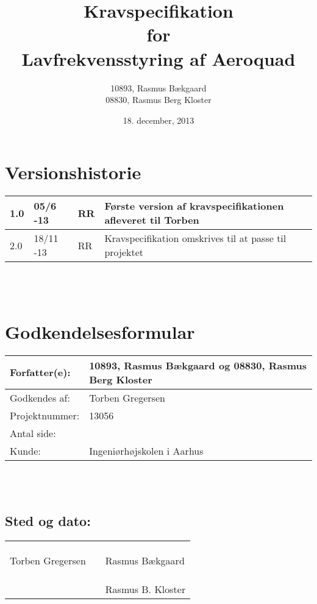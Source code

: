 \documentclass[oneside, 12pt]{memoir}
\title{Kravspecifikation \\ for \\ Lavfrekvensstyring af Aeroquad}
\date{18. december, 2013}
\author{10893, Rasmus Bækgaard\\08830, Rasmus Berg Kloster}
\begin{document}
\begin{titlingpage}
  \maketitle
\end{titlingpage}


\section*{Versionshistorie}
\begin{tabular}{p{}|p{}|p{}|p{}}
1.0 & 05/6 -13 & RR & Første version af kravspecifikationen afleveret til Torben 
\\ \hline 
2.0 & 18/11 -13 & RR & Kravspecifikation omskrives til at passe til projektet 
\end{tabular} 
\\
\\
\section*{Godkendelsesformular}
\begin{tabular}{p{}|p{}}
\hline 
Forfatter(e): & 10893, Rasmus Bækgaard og 08830, Rasmus Berg Kloster\\ 
\hline 
Godkendes af: & Torben Gregersen \\ 
\hline
Projektnummer: & 13056\\
\hline
Antal side: & \pageref{LastPage} \\
\hline 
Kunde: & Ingeniørhøjskolen i Aarhus \\
\hline
\end{tabular} 
\\
\\
\subsection*{Sted og dato:}
\begin{tabular}{p{} p{} p{}}
&& \\
&& \\
\underline{\qquad \qquad \qquad \qquad \qquad} & \qquad \qquad \qquad & \underline{\qquad \qquad \qquad \qquad \qquad}  \\ 
Torben Gregersen & & Rasmus Bækgaard \\ \\\\
&&  \underline{\qquad \qquad \qquad \qquad \qquad}  \\
& & Rasmus B. Kloster
\end{tabular} 
\end{document}
